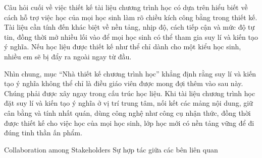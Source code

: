 {{    Câu hỏi cuối về việc thiết kế tài liệu chương trình học có dựa trên hiểu biết về cách hỗ trợ việc học của mọi học sinh làm rõ chiều kích công bằng trong thiết kế. Tài liệu cần tính đến khác biệt về nền tảng, nhịp độ, cách tiếp cận và mức độ tự tin, đồng thời mở nhiều lối vào để mọi học sinh có thể tham gia suy lí và kiến tạo ý nghĩa. Nếu học liệu được thiết kế như thể chỉ dành cho một kiểu học sinh, nhiều em sẽ bị đẩy ra ngoài ngay từ đầu.

    Nhìn chung, mục ``Nhà thiết kế chương trình học'' khẳng định rằng suy lí và kiến tạo ý nghĩa không thể chỉ là điều giáo viên được mong đợi thêm vào sau này. Chúng phải được xây ngay trong cấu trúc học liệu. Khi tài liệu chương trình học đặt suy lí và kiến tạo ý nghĩa ở vị trí trung tâm, nối kết các mảng nội dung, giữ cân bằng và tính nhất quán, dùng công nghệ như công cụ nhận thức, đồng thời được thiết kế cho việc học của mọi học sinh, lớp học mới có nền tảng vững để đi đúng tinh thần ấn phẩm.}
  }

\ParallelSection
  {Collaboration among Stakeholders}
  {Sự hợp tác giữa các bên liên quan}
  {}

